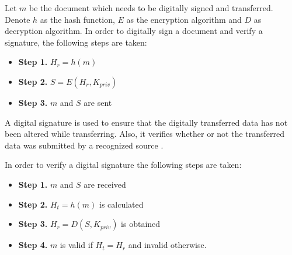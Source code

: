 		\begin{defn} 
			Let $m$ be the document which needs to be digitally signed and transferred. Denote $h$ as the hash function, $E$ as the encryption algorithm and $D$ as decryption algorithm. In order to digitally sign a document and verify a signature, the following steps are taken:
			\begin{itemize}
				\item \textbf{Step 1.} $H_r = h(m)$
				\item \textbf{Step 2.} $S = E(H_r,K_{priv})$
				\item \textbf{Step 3.} $m$ and $S$ are sent
			\end{itemize}
		\label{dfn:digital_signature}
		\end{defn}

		A digital signature is used to ensure that the digitally transferred data has not been altered while transferring. Also, it verifies whether or not the transferred data was submitted by a recognized source \cite{katz2010digital}.\\

		\begin{defn}
			In order to verify a digital signature the following steps are taken:
			\begin{itemize}
				\item \textbf{Step 1.} $m$ and $S$ are received
				\item \textbf{Step 2.} $H_t = h(m)$ is calculated
				\item \textbf{Step 3.} $H_r = D(S,K_{priv})$ is obtained
				\item \textbf{Step 4.} $m$ is valid if $H_t = H_r$ and invalid otherwise.
			\end{itemize}
		\label{dfn:signature_verification}
		\end{defn}

